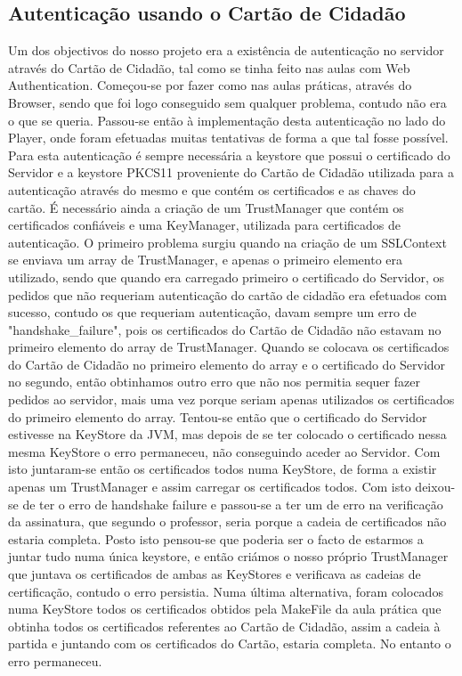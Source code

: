 \documentclass[pdftex,12pt,a4paper]{report}
\begin{document}
\subsection{Autenticação usando o Cartão de Cidadão}
Um dos objectivos do nosso projeto era a existência de autenticação no servidor através do Cartão de Cidadão, tal como se tinha feito nas aulas com Web Authentication.
Começou-se por fazer como nas aulas práticas, através do Browser, sendo que foi logo conseguido sem qualquer problema, contudo não era o que se queria. Passou-se então à implementação desta autenticação no lado do Player, onde foram efetuadas muitas tentativas de forma a que tal fosse possível. 
Para esta autenticação é sempre necessária a keystore que possui o certificado do Servidor e a keystore PKCS11 proveniente do Cartão de Cidadão utilizada para a autenticação através do mesmo e que contém os certificados e as chaves do cartão.
É necessário ainda a criação de um TrustManager que contém os certificados confiáveis e uma KeyManager, utilizada para certificados de autenticação.
O primeiro problema surgiu quando na criação de um SSLContext se enviava um array de TrustManager, e apenas o primeiro elemento era utilizado, sendo que quando era carregado primeiro o certificado do Servidor, os pedidos que não requeriam autenticação do cartão de cidadão era efetuados com sucesso, contudo os que requeriam autenticação, davam sempre um erro de "handshake\_failure", pois os certificados do Cartão de Cidadão não estavam no primeiro elemento do array de TrustManager. Quando se colocava os certificados do Cartão de Cidadão no primeiro elemento do array e o certificado do Servidor no segundo, então obtinhamos outro erro que não nos permitia sequer fazer pedidos ao servidor, mais uma vez porque seriam apenas utilizados os certificados do primeiro elemento do array.
Tentou-se então que o certificado do Servidor estivesse na KeyStore da JVM, mas depois de se ter colocado o certificado nessa mesma KeyStore o erro permaneceu, não conseguindo aceder ao Servidor.
Com isto juntaram-se então os certificados todos numa KeyStore, de forma a existir apenas um TrustManager e assim carregar os certificados todos. Com isto deixou-se de ter o erro de handshake failure e passou-se a ter um de erro na verificação da assinatura, que segundo o professor, seria porque a cadeia de certificados não estaria completa.
Posto isto pensou-se que poderia ser o facto de estarmos a juntar tudo numa única keystore, e então criámos o nosso próprio TrustManager que juntava os certificados de ambas as KeyStores e verificava as cadeias de certificação, contudo o erro persistia.
Numa última alternativa, foram colocados numa KeyStore todos os certificados obtidos pela MakeFile da aula prática que obtinha todos os certificados referentes ao Cartão de Cidadão, assim a cadeia à partida e juntando com os certificados do Cartão, estaria completa. No entanto o erro permaneceu.
\end{document}
